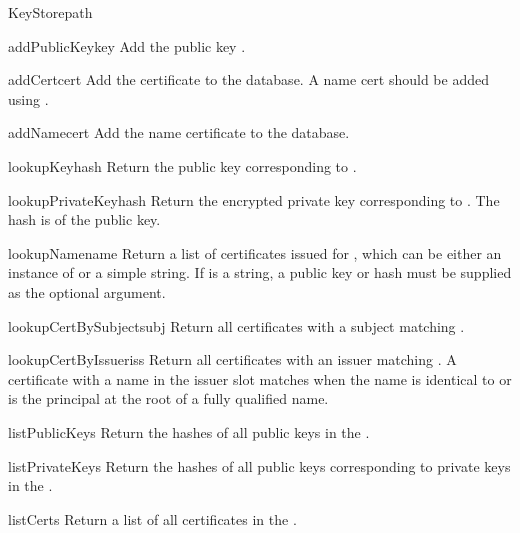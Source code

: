 \documentclass{howto}
\begin{document}
\begin{classdesc}{KeyStore}{path}
\begin{methoddesc}{addPublicKey}{key}
Add the public key .
\end{methoddesc}

\begin{methoddesc}{addCert}{cert}
Add the certificate  to the database.  A name cert should be
added using .
\end{methoddesc}

\begin{methoddesc}{addName}{cert}
Add the name certificate  to the database.
\end{methoddesc}

\begin{methoddesc}{lookupKey}{hash}
Return the public key corresponding to .
\end{methoddesc}

\begin{methoddesc}{lookupPrivateKey}{hash}
Return the encrypted private key corresponding to .  The
hash is of the public key.
\end{methoddesc}

\begin{methoddesc}{lookupName}{name}
Return a list of certificates issued for , which can be
either an instance of  or a simple
string.  If  is a string, a public key or hash must be
supplied as the optional  argument.
\end{methoddesc}

\begin{methoddesc}{lookupCertBySubject}{subj}
Return all certificates with a subject matching .
\end{methoddesc}

\begin{methoddesc}{lookupCertByIssuer}{iss}
Return all certificates with an issuer matching .  A
certificate with a name in the issuer slot matches when the name is
identical to  or  is the principal at the root of a
fully qualified name.
\end{methoddesc}

\begin{methoddesc}{listPublicKeys}{}
Return the hashes of all public keys in the .
\end{methoddesc}

\begin{methoddesc}{listPrivateKeys}{}
Return the hashes of all public keys corresponding to private keys in
the . 
\end{methoddesc}

\begin{methoddesc}{listCerts}{}
Return a list of all certificates in the .
\end{methoddesc}

\end{classdesc}
\end{document}

